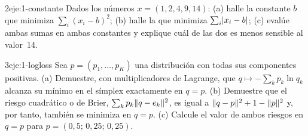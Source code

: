 \begin{ejercicio}{2}{eje:1-constante}
Dados los números $x=(1,2,4,9,14)$: (a) halle la constante $b$ que minimiza $\sum_i(x_i-b)^{2}$; (b) halle la que minimiza $\sum_i\lvert x_i-b\rvert$; (c) evalúe ambas sumas en ambas constantes y explique cuál de las dos es menos sensible al valor~14.
\end{ejercicio}

\begin{ejercicio}{3}{eje:1-logloss}
Sea $p=(p_1,\dots,p_K)$ una distribución con todas sus componentes positivas. (a) Demuestre, con multiplicadores de Lagrange, que $q\mapsto-\sum_k p_k\ln q_k$ alcanza su mínimo en el símplex exactamente en $q=p$. (b) Demuestre que el riesgo cuadrático o de Brier, $\sum_k p_k\lVert q-e_k\rVert^{2}$, es igual a $\lVert q-p\rVert^{2}+1-\lVert p\rVert^{2}$ y, por tanto, también se minimiza en $q=p$. (c) Calcule el valor de ambos riesgos en $q=p$ para $p=(0{,}5;\,0{,}25;\,0{,}25)$.
\end{ejercicio}
